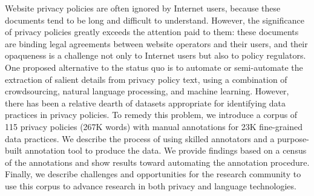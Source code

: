Website privacy policies are often ignored by Internet users, because these documents tend to be long and difficult to understand. However, the significance of privacy policies greatly exceeds the attention paid to them: these documents are binding legal agreements between website operators and their users, and their opaqueness is a challenge not only to Internet users but also to policy regulators. One proposed alternative to the status quo is to automate or semi-automate the extraction of salient details from privacy policy text, using a combination of crowdsourcing, natural language processing, and machine learning. However, there has been a relative dearth of datasets appropriate for identifying data practices in privacy policies. To remedy this problem, we introduce a corpus of 115 privacy policies (267K words) with manual annotations for 23K fine-grained data practices. We describe the process of using skilled annotators and a purpose-built annotation tool to produce the data. We provide findings based on a census of the annotations and show results toward automating the annotation procedure. Finally, we describe challenges and opportunities for the research community to use this corpus to advance research in both privacy and language technologies.
